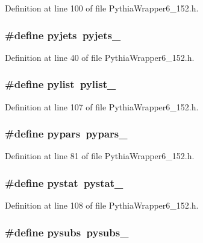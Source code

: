 Definition at line 100 of file Pythia\-Wrapper6\_\-152.h.
\subsubsection{\setlength{\rightskip}{0pt plus 5cm}\#define pyjets~{\bf pyjets\_\-}}\label{PythiaWrapper6__152_8h_42bad680548e15c3c12a4874fa4d1ccc}




Definition at line 40 of file Pythia\-Wrapper6\_\-152.h.
\subsubsection{\setlength{\rightskip}{0pt plus 5cm}\#define pylist~pylist\_\-}\label{PythiaWrapper6__152_8h_1dbe019361406129606ebb26aae757b9}




Definition at line 107 of file Pythia\-Wrapper6\_\-152.h.
\subsubsection{\setlength{\rightskip}{0pt plus 5cm}\#define pypars~{\bf pypars\_\-}}\label{PythiaWrapper6__152_8h_8da7c9220b540db4b5ab2b9dce72eb8c}




Definition at line 81 of file Pythia\-Wrapper6\_\-152.h.
\subsubsection{\setlength{\rightskip}{0pt plus 5cm}\#define pystat~pystat\_\-}\label{PythiaWrapper6__152_8h_1237254f076fc7dfb0519e6b4d5b0f3e}




Definition at line 108 of file Pythia\-Wrapper6\_\-152.h.
\subsubsection{\setlength{\rightskip}{0pt plus 5cm}\#define pysubs~{\bf pysubs\_\-}}\label{PythiaWrapper6__152_8h_c68bb5af2fc4dac62c64cc8cb6e9f767}




